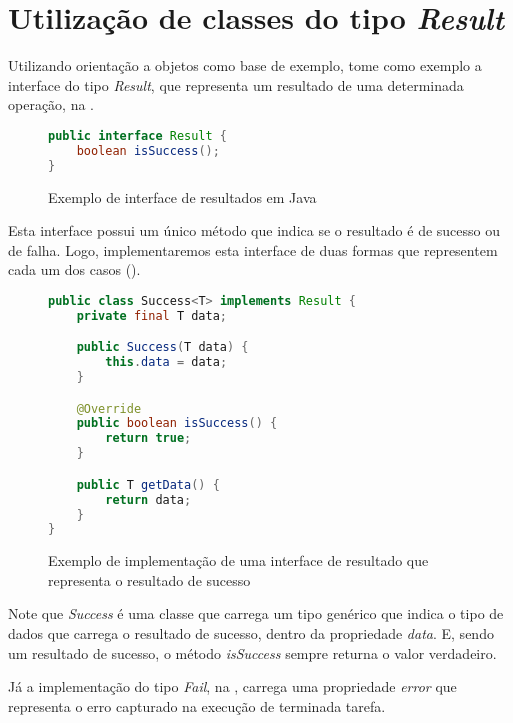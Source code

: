 \section{Utilização de classes do tipo \textit{Result}}

Utilizando orientação a objetos como base de exemplo, tome como exemplo a interface do tipo \textit{Result}, que representa um resultado de uma determinada operação, na .

\begin{figure}[H]
    \centering
    \begin{lstlisting}[language=Java]
public interface Result {
    boolean isSuccess();
}
    \end{lstlisting}
    \caption{Exemplo de interface de resultados em Java}
    \label{fig:java_result_interface}
\end{figure}

Esta interface possui um único método que indica se o resultado é de sucesso ou de falha. Logo, implementaremos esta interface de duas formas que representem cada um dos casos ().

\begin{figure}[H]
    \centering
    \begin{lstlisting}[language=Java]
public class Success<T> implements Result {
    private final T data;

    public Success(T data) {
        this.data = data;
    }

    @Override
    public boolean isSuccess() {
        return true;
    }

    public T getData() {
        return data;
    }
}
    \end{lstlisting}
    \caption{Exemplo de implementação de uma interface de resultado que representa o resultado de sucesso}
    \label{fig:java_success_result_implementation}
\end{figure}

Note que \textit{Success} é uma classe que carrega um tipo genérico que indica o tipo de dados que carrega o resultado de sucesso, dentro da propriedade \textit{data}. E, sendo um resultado de sucesso, o método \textit{isSuccess} sempre returna o valor verdadeiro.

Já a implementação do tipo \textit{Fail}, na , carrega uma propriedade \textit{error} que representa o erro capturado na execução de terminada tarefa.

